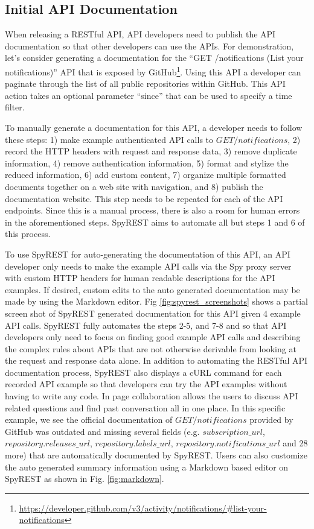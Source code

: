 \documentclass[conference]{IEEEtran}
\begin{document}
\subsection{Initial API Documentation} %
When releasing a RESTful API, API developers need to publish the API documentation so that other developers can use the APIs. For demonstration, let's consider generating a documentation for the ``GET /notifications (List your notifications)'' API that is exposed by GitHub\footnote{\url{https://developer.github.com/v3/activity/notifications/#list-your-notifications}}. Using this API a developer can paginate through the list of all public repositories within GitHub. This API action takes an optional parameter ``since'' that can be used to specify a time filter.

To manually generate a documentation for this API, a developer needs to follow these steps: 1) make example authenticated API calls to $GET /notifications$, 2) record the HTTP headers with request and response data, 3) remove duplicate information, 4) remove authentication information, 5) format and stylize the reduced information, 6) add custom content, 7) organize multiple formatted documents together on a web site with navigation, and 8) publish the documentation website. This step needs to be repeated for each of the API endpoints. Since this is a manual process, there is also a room for human errors in the aforementioned steps. SpyREST aims to automate all but steps 1 and 6 of this process.

To use SpyREST for auto-generating the documentation of this API, an API developer only needs to make the example API calls via the Spy proxy server with custom HTTP headers for human readable descriptions for the API examples. If desired, custom edits to the auto generated documentation may be made by using the Markdown editor. Fig \ref{fig:spyrest_screenshots} shows a partial screen shot of SpyREST generated documentation for this API given 4 example API calls. SpyREST fully automates the steps 2-5, and 7-8 and so that API developers only need to focus on finding good example API calls and describing the complex rules about APIs that are not otherwise derivable from looking at the request and response data alone. In addition to automating the RESTful API documentation process, SpyREST also displays a cURL command for each recorded API example so that developers can try the API examples without having to write any code. In page collaboration allows the users to discuss API related questions and find past conversation all in one place. In this specific example, we see the official documentation of $GET /notifications$ provided by GitHub was outdated and missing several fields (e.g. $subscription\_url$, $repository.releases\_url$, $repository.labels\_url$, $repository.notifications\_url$ and 28 more) that are automatically documented by SpyREST. Users can also customize the auto generated summary information using a Markdown based editor on SpyREST as shown in Fig. \ref{fig:markdown}.
\end{document}
